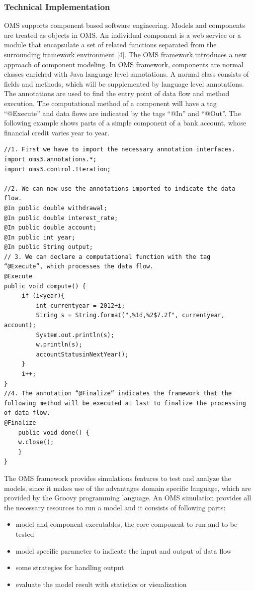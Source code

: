 \subsubsection{Technical Implementation}
\par
OMS supports component based software engineering. Models and components are treated as objects in OMS. An individual component is a web service or a module that encapsulate a set of related functions separated from the surrounding framework environment [4]. The OMS framework introduces a new approach of component modeling. In OMS framework, components are normal classes enriched with Java language level annotations. A normal class consists of fields and methods, which will be supplemented by language level annotations. The annotations are used to find the entry point of data flow and method execution. The computational method of a component will have a tag “@Execute” and data flows are indicated by the tags “@In” and “@Out”.
The following example shows parts of a simple component of a bank account, whose financial credit varies year to year.
\begin{verbatim}
//1. First we have to import the necessary annotation interfaces.
import oms3.annotations.*;
import oms3.control.Iteration;

//2. We can now use the annotations imported to indicate the data flow.
@In public double withdrawal;
@In public double interest_rate;
@In public double account;
@In public int year;
@In public String output;
// 3. We can declare a computational function with the tag 
“@Execute”, which processes the data flow.
@Execute
public void compute() {
	 if (i<year){
		 int currentyear = 2012+i;
		 String s = String.format(",%1d,%2$7.2f", currentyear, account);
		 System.out.println(s);
		 w.println(s);
		 accountStatusinNextYear();
	 }
	 i++;
}
//4. The annotation “@Finalize” indicates the framework that the 
following method will be executed at last to finalize the processing 
of data flow.
@Finalize
	public void done() {
	w.close();
	}
}
\end{verbatim}
\par
The OMS framework provides simulations features to test and analyze the models, since it makes use of the advantages domain specific language, which are provided by the Groovy programming language. An OMS simulation provides all the necessary resources to run a model and it consists of following parts:
\begin{itemize}
  \item model and component executables, the core component to run and to be tested	
  \item model specific parameter to indicate the input and output of data flow
  \item some strategies for handling output	
  \item evaluate the model result with statistics or visualization
\end{itemize}
